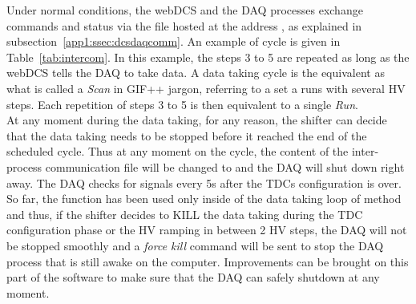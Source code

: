     Under normal conditions, the webDCS and the DAQ processes exchange commands and status via the file hosted at the address , as explained in subsection~\ref{app1:ssec:dcsdaqcomm}. An example of cycle is given in Table~\ref{tab:intercom}. In this example, the steps 3 to 5 are repeated as long as the webDCS tells the DAQ to take data. A data taking cycle is the equivalent as what is called a \textit{Scan} in GIF++ jargon, referring to a set a runs with several HV steps. Each repetition of steps 3 to 5 is then equivalent to a single \textit{Run}.\\
    At any moment during the data taking, for any reason, the shifter can decide that the data taking needs to be stopped before it reached the end of the scheduled cycle. Thus at any moment on the cycle, the content of the inter-process communication file will be changed to  and the DAQ will shut down right away. The DAQ checks for  signals every 5s after the TDCs configuration is over. So far, the function  has been used only inside of the data taking loop of method  and thus, if the shifter decides to KILL the data taking during the TDC configuration phase or the HV ramping in between 2 HV steps, the DAQ will not be stopped smoothly and a \textit{force kill} command will be sent to stop the DAQ process that is still awake on the computer. Improvements can be brought on this part of the software to make sure that the DAQ can safely shutdown at any moment.\\
    
